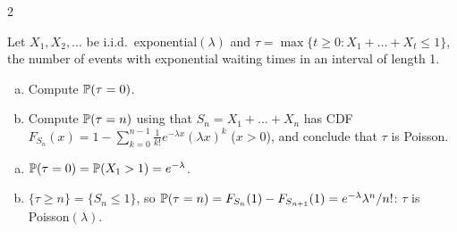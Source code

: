 \begin{paracol}{2}
\begin{exercise}\label{ch03:ex-poissoncount}
Let $X_1,X_2,\dots$ be i.i.d.\ exponential$(\lambda)$ and $\tau=\max\{t\ge0:X_1+\dots+X_t\le1\}$, the number of events with
exponential waiting times in an interval of length 1.
\begin{enumerate}[(a)]
  \item Compute $\mathbb{P}(\tau=0)$.
  \item Compute $\mathbb{P}(\tau=n)$ using
      that $S_n=X_1+\dots+X_n$ has CDF $F_{S_n}(x)=1-\sum_{k=0}^{n-1}\frac1{k!}e^{-\lambda x}(\lambda x)^k$ ($x>0$), and conclude that
      $\tau$ is Poisson.
\end{enumerate}
\end{exercise}
\begin{solution}[ch03:ex-poissoncount]
\begin{enumerate}[(a)]
  \item $\mathbb{P}(\tau=0)=\mathbb{P}(X_1>1)=e^{-\lambda}$.
  \item $\{\tau\ge n\}=\{S_n\le1\}$, so $\mathbb{P}(\tau=n)=F_{S_n}(1)-F_{S_{n+1}}(1)=e^{-\lambda}\lambda^n/n!$: $\tau$ is Poisson$(\lambda)$.
\end{enumerate}
\end{solution}


\end{paracol}
